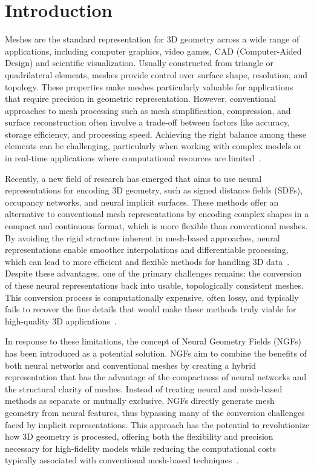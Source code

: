\section{Introduction}
Meshes are the standard representation for 3D geometry across a wide range of applications, including computer graphics, video games, CAD (Computer-Aided Design) and scientific visualization.
Usually constructed from triangle or quadrilateral elements, meshes provide control over surface shape, resolution, and topology.
These properties make meshes particularly valuable for applications that require precision in geometric representation.
However, conventional approaches to mesh processing such as mesh simplification, compression, and surface reconstruction often involve a trade-off between factors like accuracy, storage efficiency, and processing speed.
Achieving the right balance among these elements can be challenging, particularly when working with complex models or in real-time applications where computational resources are limited~\cite{maglo2015}.

Recently, a new field of research has emerged that aims to use neural representations for encoding 3D geometry, such as signed distance fields (SDFs), occupancy networks, and neural implicit surfaces.
These methods offer an alternative to conventional mesh representations by encoding complex shapes in a compact and continuous format, which is more flexible than conventional meshes.
By avoiding the rigid structure inherent in mesh-based approaches, neural representations enable smoother interpolations and differentiable processing, which can lead to more efficient and flexible methods for handling 3D data~\cite{Park2019}.
Despite these advantages, one of the primary challenges remains: the conversion of these neural representations back into usable, topologically consistent meshes.
This conversion process is computationally expensive, often lossy, and typically fails to recover the fine details that would make these methods truly viable for high-quality 3D applications~\cite{sivaram2024}\cite{tretschk2021}.

In response to these limitations, the concept of Neural Geometry Fields (NGFs) has been introduced as a potential solution.
NGFs aim to combine the benefits of both neural networks and conventional meshes by creating a hybrid representation that has the advantage of the compactness of neural networks and the structural clarity of meshes.
Instead of treating neural and mesh-based methods as separate or mutually exclusive, NGFs directly generate mesh geometry from neural features, thus bypassing many of the conversion challenges faced by implicit representations.
This approach has the potential to revolutionize how 3D geometry is processed, offering both the flexibility and precision necessary for high-fidelity models while reducing the computational costs typically associated with conventional mesh-based techniques~\cite{sivaram2024}\cite{tretschk2021}.

